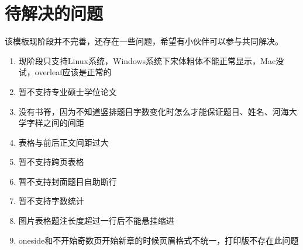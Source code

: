 \chapter{待解决的问题}
该模板现阶段并不完善，还存在一些问题，希望有小伙伴可以参与共同解决。

\begin{enumerate}
    \item 现阶段只支持Linux系统，Windows系统下宋体粗体不能正常显示，Mac没试，overleaf应该是正常的
    \item 暂不支持专业硕士学位论文
    \item 没有书脊，因为不知道竖排题目字数变化时怎么才能保证题目、姓名、河海大学字样之间的间距
    \item 表格与前后正文间距过大
    \item 暂不支持跨页表格
    \item 暂不支持封面题目自助断行
    \item 暂不支持字数统计
    \item 图片表格题注长度超过一行后不能悬挂缩进
    \item oneside和不开始奇数页开始新章的时候页眉格式不统一，打印版不存在此问题
\end{enumerate}